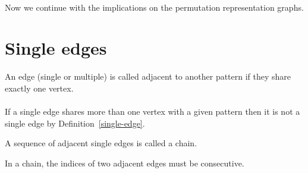 \paragraph{}
Now we continue with the implications on the permutation representation graphs.

\section{Single edges}

\begin{definition}
  An edge (single or multiple) is called adjacent to another pattern if they share exactly one vertex.
\end{definition}

\paragraph{}
If a single edge shares more than one vertex with a given pattern then it is not a single edge by Definition~\ref{single-edge}.

\begin{definition}
  A sequence of adjacent single edges is called a chain.
\end{definition}

\begin{proposition}
  \label{chain-consecutive}
  In a chain, the indices of two adjacent edges must be consecutive.
\end{proposition}

